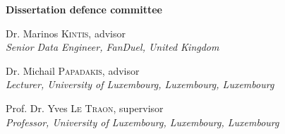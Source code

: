 \begin{adjustwidth*}{1em}{1em}

\noindent
\textbf{\large Dissertation defence committee}


\vspace{0.2cm}
\noindent
Dr.  Marinos \textsc{Kintis}, advisor\\
{\small \emph{Senior Data Engineer, FanDuel, United Kingdom}}   

\vspace{0.2cm}
\noindent
Dr. Michail \textsc{Papadakis}, advisor\\
{\small \emph{Lecturer, University of Luxembourg, Luxembourg, Luxembourg}}   

\vspace{0.2cm}
\noindent
Prof. Dr. Yves \textsc{Le Traon}, supervisor\\
{\small \emph{Professor, University of Luxembourg, Luxembourg, Luxembourg}}

\end{adjustwidth*}

\restoregeometry